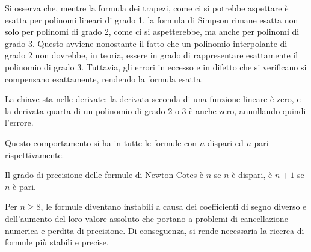 \documentclass{article}
\begin{document}
\begin{oss}
    Si osserva che, mentre la formula dei trapezi, come ci si potrebbe
    aspettare è esatta per polinomi lineari di grado 1, la formula di Simpson
    rimane esatta non solo per polinomi di grado 2, come ci si
    aspetterebbe, ma anche per polinomi di grado 3. Questo avviene nonostante
    il fatto che un polinomio interpolante di grado 2 non dovrebbe, in teoria,
    essere in grado di rappresentare esattamente il polinomio di grado 3.
    Tuttavia, gli errori in eccesso e in difetto che si verificano si
    compensano esattamente, rendendo la formula esatta.

    La chiave sta nelle derivate: la derivata seconda di una funzione lineare
    è zero, e la derivata quarta di un polinomio di grado 2 o 3 è anche zero,
    annullando quindi l'errore.
    \begin{center}
            \end{center}
    Questo comportamento si ha in tutte le formule con $n$ dispari ed $n$ pari
    rispettivamente.
\end{oss}
\begin{theorem}
    Il grado di precisione delle formule di Newton-Cotes è $n$ se $n$ è
    dispari, è $n+1$ se $n$ è pari.
\end{theorem}
Per $n\geq8$, le formule diventano instabili a causa dei
coefficienti di \underline{segno diverso} e dell'aumento del loro valore
assoluto che portano a problemi di cancellazione numerica e
perdita di precisione. Di conseguenza, si rende necessaria la ricerca di
formule più stabili e precise.
\end{document}
